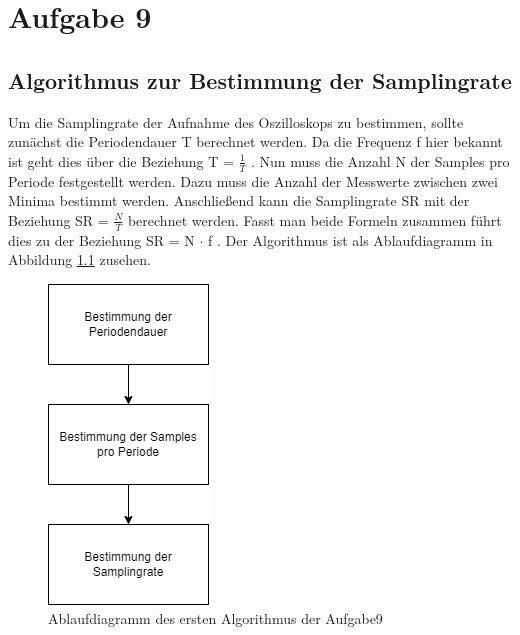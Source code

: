 \chapter{Aufgabe 9}
\section{Algorithmus zur Bestimmung der Samplingrate}
Um die Samplingrate der Aufnahme des Oszilloskops zu bestimmen, sollte zunächst die Periodendauer T berechnet werden.
Da die Frequenz f hier bekannt ist geht dies über die Beziehung T = $\frac{1}{T}$ .
Nun muss die Anzahl N der Samples pro Periode festgestellt werden.
Dazu muss die Anzahl der Messwerte zwischen zwei Minima bestimmt werden.
Anschließend kann die Samplingrate SR mit der Beziehung SR = $\frac{N}{T}$ berechnet werden.
Fasst man beide Formeln zusammen führt dies zu der Beziehung SR = N $\cdot$ f .
Der Algorithmus ist als Ablaufdiagramm in Abbildung \ref{algo1} zusehen. \par 

\begin{figure}[h]
	\centering
	\includegraphics[scale=0.5]{Images/aufgabe9_algo1.png}
	\caption{Ablaufdiagramm des ersten Algorithmus der Aufgabe9}
	\label{algo1}
\end{figure}

